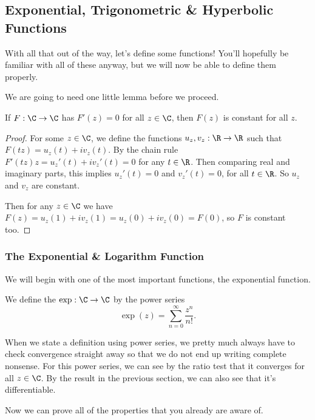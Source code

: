 \subsection{Exponential, Trigonometric \& Hyperbolic Functions}

With all that out of the way, let's define some functions! You'll hopefully be familiar with all of these anyway, but we will now be able to define them properly.

We are going to need one little lemma before we proceed.

\begin{lemma}
	If $F: \C \rightarrow \C$ has $F'(z) = 0$ for all $z \in \C$, then $F(z)$ is constant for all $z$.
\end{lemma}
\begin{proof}
	For some $z \in \C$, we define the functions $u_z, v_z : \R \rightarrow \R$ such that 
	$F(tz) = u_z(t) + i v_z(t)$.  By the chain rule $F'(tz) z = u_z'(t) + iv_z'(t) = 0$ for any $t \in \R$.	
	Then comparing real and imaginary parts, this implies $u_z'(t) = 0$ and $v_z'(t) = 0$, for all $t \in \R$.  So $u_z$ and $v_z$ are constant.

	Then for any $z \in \C$ we have $F(z) = u_z(1) + i v_z(1) = u_z(0) + i v_z(0) = F(0)$, so $F$ is constant too.
\end{proof}

\subsubsection{The Exponential \& Logarithm Function}

We will begin with one of the most important functions, the exponential function.

\begin{definition}
	We define the  $\exp: \C \rightarrow \C$ by the power series
	$$
	\exp(z) = \sum_{n = 0}^{\infty} \frac{z^n}{n!}.
	$$
\end{definition}

When we state a definition using power series, we pretty much always have to check convergence straight away so that we do not end up writing complete nonsense.
For this power series, we can see by the ratio test that it converges for all $z \in \C$. By the result in the previous section, we can also see that it's differentiable.

Now we can prove all of the properties that you already are aware of.

